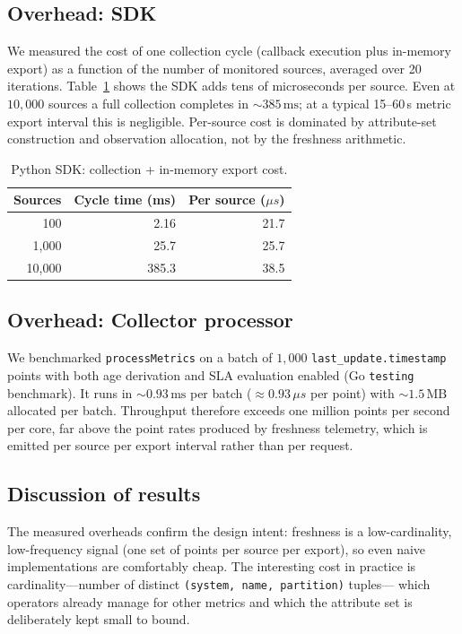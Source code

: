 \documentclass[11pt]{article}
\begin{document}
\subsection{Overhead: SDK}
We measured the cost of one collection cycle (callback execution plus in-memory
export) as a function of the number of monitored sources, averaged over 20
iterations. Table~\ref{tab:sdkbench} shows the SDK adds tens of microseconds per
source. Even at \(10{,}000\) sources a full collection completes in
\(\sim\!385\,\text{ms}\); at a typical 15--60\,s metric export interval this is
negligible. Per-source cost is dominated by attribute-set construction and
observation allocation, not by the freshness arithmetic.

\begin{table}[t]
\centering
\caption{Python SDK: collection + in-memory export cost.}
\label{tab:sdkbench}
\begin{tabular}{rrr}
\toprule
Sources & Cycle time (ms) & Per source (\(\mu s\)) \\
\midrule
100 & 2.16 & 21.7 \\
1{,}000 & 25.7 & 25.7 \\
10{,}000 & 385.3 & 38.5 \\
\bottomrule
\end{tabular}
\end{table}

\subsection{Overhead: Collector processor}
We benchmarked \texttt{processMetrics} on a batch of \(1{,}000\)
\texttt{last\_update.timestamp} points with both age derivation and SLA
evaluation enabled (Go \texttt{testing} benchmark). It runs in
\(\sim\!0.93\,\text{ms}\) per batch (\(\approx 0.93\,\mu s\) per point) with
\(\sim\!1.5\,\text{MB}\) allocated per batch. Throughput therefore exceeds one
million points per second per core, far above the point rates produced by
freshness telemetry, which is emitted per source per export interval rather than
per request.

\subsection{Discussion of results}
The measured overheads confirm the design intent: freshness is a low-cardinality,
low-frequency signal (one set of points per source per export), so even naive
implementations are comfortably cheap. The interesting cost in practice is
cardinality---number of distinct \texttt{(system, name, partition)} tuples---
which operators already manage for other metrics and which the attribute set is
deliberately kept small to bound.
\end{document}
